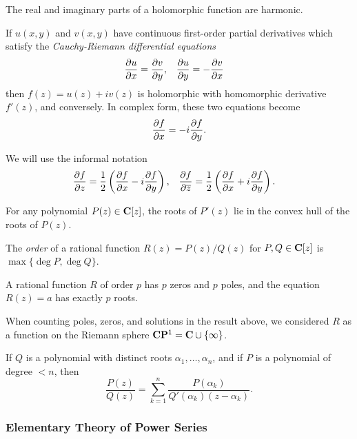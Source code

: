 The real and imaginary parts of a holomorphic function are harmonic.

\begin{proposition}
  If $u(x,y)$ and $v(x,y)$ have continuous first-order partial derivatives which satisfy the \emph{Cauchy-Riemann differential equations}
  \begin{align*}
    \frac{\partial u}{\partial x} &=  \frac{\partial v}{\partial y}, &
    \frac{\partial u}{\partial y} &= -\frac{\partial v}{\partial x}
  \end{align*}
  then $f(z) = u(z) + i v(z)$ is holomorphic with homomorphic derivative $f'(z)$, and conversely. In complex form, these two equations become
  \[
  \frac{\partial f}{\partial x} = -i \frac{\partial f}{\partial y}.
  \]
\end{proposition}

We will use the informal notation
\begin{align*}
  \frac{\partial f}{\partial z} &= \frac{1}{2} \left( \frac{\partial f}{\partial x} - i \frac{\partial f}{\partial y} \right), &
  \frac{\partial f}{\partial \overline{z}} &= \frac{1}{2} \left( \frac{\partial f}{\partial x} + i \frac{\partial f}{\partial y} \right).
\end{align*}

\begin{theorem}
  For any polynomial $P(z) \in \mathbf{C}[z]$, the roots of $P'(z)$ lie in the convex hull of the roots of $P(z)$.
\end{theorem}

\begin{definition}
  The \emph{order} of a rational function $R(z) = P(z)/Q(z)$ for $P,Q \in \mathbf{C}[z]$ is $\max\{\deg P, \deg Q\}$.
\end{definition}

\begin{proposition}
  A rational function $R$ of order $p$ has $p$ zeros and $p$ poles, and the equation $R(z) = a$ has exactly $p$ roots.
\end{proposition}

When counting poles, zeros, and solutions in the result above, we considered $R$ as a function on the Riemann sphere $\mathbf{C}\mathbf{P}^1 = \mathbf{C} \cup \{\infty\}$.

\begin{proposition}
  If $Q$ is a polynomial with distinct roots $\alpha_1, \dots, \alpha_n$, and if $P$ is a polynomial of degree $< n$, then
  \[
   \frac{P(z)}{Q(z)} = \sum_{k=1}^n \frac{P(\alpha_k)}{Q'(\alpha_k)(z-\alpha_k)}.
  \]
\end{proposition}

\subsubsection{Elementary Theory of Power Series}

